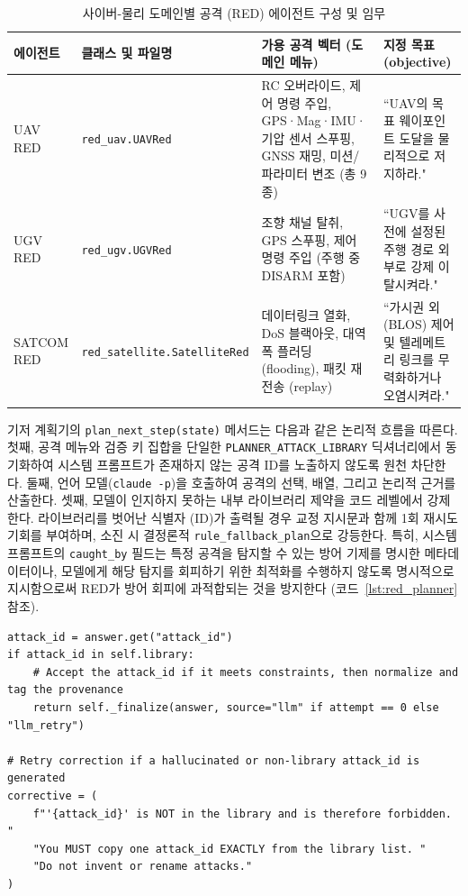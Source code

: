 \begin{table}[t!]
\centering
\caption{사이버-물리 도메인별 공격 (RED) 에이전트 구성 및 임무}
\label{tab:red_agents}
\renewcommand{\arraystretch}{1.3}
\small
\begin{tabularx}{\textwidth}{@{} l l >{\raggedright\arraybackslash}X >{\raggedright\arraybackslash}X @{}}
\toprule
\textbf{에이전트} & \textbf{클래스 및 파일명} & \textbf{가용 공격 벡터 (도메인 메뉴)} & \textbf{지정 목표 (objective)} \\
\midrule
UAV RED & \texttt{red\_uav.UAVRed} & RC 오버라이드, 제어 명령 주입, GPS·Mag·IMU·기압 센서 스푸핑, GNSS 재밍, 미션/파라미터 변조  (총 9종) & ``UAV의 목표 웨이포인트 도달을 물리적으로 저지하라." \\
UGV RED & \texttt{red\_ugv.UGVRed} & 조향 채널 탈취, GPS 스푸핑, 제어 명령 주입 (주행 중 DISARM 포함) & ``UGV를 사전에 설정된 주행 경로 외부로 강제 이탈시켜라." \\
SATCOM RED & \texttt{red\_satellite.SatelliteRed} & 데이터링크 열화, DoS 블랙아웃, 대역폭 플러딩 (flooding), 패킷 재전송 (replay) & ``가시권 외 (BLOS) 제어 및 텔레메트리 링크를 무력화하거나 오염시켜라." \\
\bottomrule
\end{tabularx}
\end{table}

기저 계획기의 \texttt{plan\_next\_step(state)} 메서드는 다음과 같은 논리적 흐름을 따른다. 첫째, 공격 메뉴와 검증 키 집합을 단일한 \texttt{PLANNER\_ATTACK\_LIBRARY} 딕셔너리에서 동기화하여 시스템 프롬프트가 존재하지 않는 공격 ID를 노출하지 않도록 원천 차단한다. 둘째, 언어 모델(\texttt{claude -p})을 호출하여 공격의 선택, 배열, 그리고 논리적 근거를 산출한다. 셋째, 모델이 인지하지 못하는 내부 라이브러리 제약을 코드 레벨에서 강제한다. 라이브러리를 벗어난 식별자 (ID)가 출력될 경우 교정 지시문과 함께 1회 재시도 기회를 부여하며, 소진 시 결정론적 \texttt{rule\_fallback\_plan}으로 강등한다. 특히, 시스템 프롬프트의 \texttt{caught\_by} 필드는 특정 공격을 탐지할 수 있는 방어 기제를 명시한 메타데이터이나, 모델에게 해당 탐지를 회피하기 위한 최적화를 수행하지 않도록 명시적으로 지시함으로써 RED가 방어 회피에 과적합되는 것을 방지한다 (코드~\ref{lst:red_planner} 참조).

\begin{lstlisting}[style=custompython, caption={\texttt{red\_planner.RedCampaignPlanner.plan\_next\_step} 내부의 라이브러리 제약 검증 및 교정 재시도 로직}, label={lst:red_planner}]
attack_id = answer.get("attack_id")
if attack_id in self.library:
    # Accept the attack_id if it meets constraints, then normalize and tag the provenance
    return self._finalize(answer, source="llm" if attempt == 0 else "llm_retry")

# Retry correction if a hallucinated or non-library attack_id is generated
corrective = (
    f"'{attack_id}' is NOT in the library and is therefore forbidden. "
    "You MUST copy one attack_id EXACTLY from the library list. "
    "Do not invent or rename attacks."
)
\end{lstlisting}

